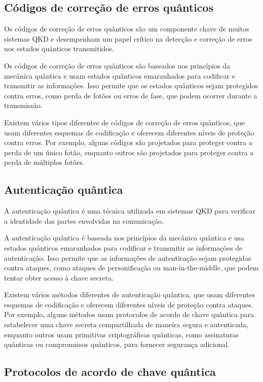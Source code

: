 \subsection{Códigos de correção de erros quânticos}

Os códigos de correção de erros quânticos são um componente chave de muitos sistemas QKD e desempenham um papel crítico na detecção e correção de erros nos estados quânticos transmitidos.

Os códigos de correção de erros quânticos são baseados nos princípios da mecânica quântica e usam estados quânticos emaranhados para codificar e transmitir as informações. Isso permite que os estados quânticos sejam protegidos contra erros, como perda de fotões ou erros de fase, que podem ocorrer durante a transmissão.

Existem vários tipos diferentes de códigos de correção de erros quânticos, que usam diferentes esquemas de codificação e oferecem diferentes níveis de proteção contra erros. Por exemplo, alguns códigos são projetados para proteger contra a perda de um único fotão, enquanto outros são projetados para proteger contra a perda de múltiplos fotões.

\subsection{Autenticação quântica}

A autenticação quântica é uma técnica utilizada em sistemas QKD para verificar a identidade das partes envolvidas na comunicação.

A autenticação quântica é baseada nos princípios da mecânica quântica e usa estados quânticos emaranhados para codificar e transmitir as informações de autenticação. Isso permite que as informações de autenticação sejam protegidas contra ataques, como ataques de personificação ou man-in-the-middle, que podem tentar obter acesso à chave secreta.

Existem vários métodos diferentes de autenticação quântica, que usam diferentes esquemas de codificação e oferecem diferentes níveis de proteção contra ataques. Por exemplo, alguns métodos usam protocolos de acordo de chave quântica para estabelecer uma chave secreta compartilhada de maneira segura e autenticada, enquanto outros usam primitivas criptográficas quânticas, como assinaturas quânticas ou compromissos quânticos, para fornecer segurança adicional.

\subsection{Protocolos de acordo de chave quântica}

